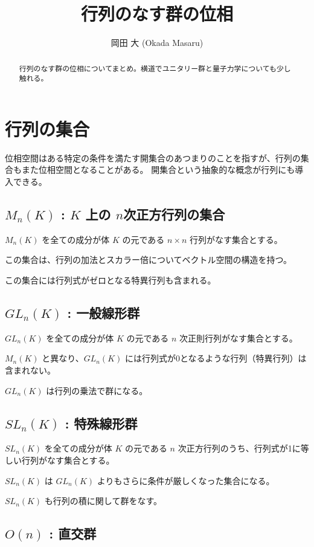 \documentclass[uplatex,a4j,12pt,dvipdfmx]{jsarticle}
\title{
行列のなす群の位相
}
\author{
岡田 大 (Okada Masaru)
}
\begin{document}
\maketitle


\begin{abstract}
	行列のなす群の位相についてまとめ。横道でユニタリー群と量子力学についても少し触れる。
\end{abstract}

\section{行列の集合}

位相空間はある特定の条件を満たす開集合のあつまりのことを指すが、行列の集合もまた位相空間となることがある。
開集合という抽象的な概念が行列にも導入できる。

\subsection{$M_{n}(K)$ : $K$ 上の $n$次正方行列の集合}

$M_{n}(K)$ を全ての成分が体 $K$ の元である $n \times n$ 行列がなす集合とする。

この集合は、行列の加法とスカラー倍についてベクトル空間の構造を持つ。

この集合には行列式がゼロとなる特異行列も含まれる。

\subsection{$GL_{n}(K)$ : 一般線形群}

$GL_{n}(K)$ を全ての成分が体 $K$ の元である $n$ 次正則行列がなす集合とする。

$M_{n}(K)$ と異なり、$GL_{n}(K)$ には行列式が0となるような行列（特異行列）は含まれない。

$GL_{n}(K)$ は行列の乗法で群になる。

\subsection{$SL_{n}(K)$ : 特殊線形群}

$SL_{n}(K)$ を全ての成分が体 $K$ の元である $n$ 次正方行列のうち、行列式が1に等しい行列がなす集合とする。

$SL_{n}(K)$ は $GL_{n}(K)$ よりもさらに条件が厳しくなった集合になる。

$SL_{n}(K)$ も行列の積に関して群をなす。

\subsection{$O(n)$ : 直交群}
\end{document}
